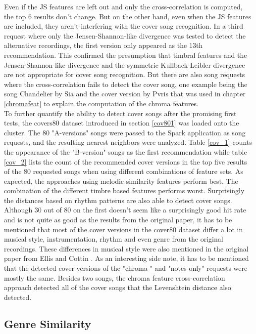 \noindent Even if the JS features are left out and only the cross-correlation is computed, the top 6 results don't change. But on the other hand, even when the JS features are included, they aren't interfering with the cover song recognition. In a third request where only the Jensen-Shannon-like divergence was tested to detect the alternative recordings, the first version only appeared as the 13th recommendation. This confirmed the presumption that timbral features and the Jensen-Shannon-like divergence and the symmetric Kullback-Leibler divergence are not appropriate for cover song recognition.
\noindent But there are also song requests where the cross-correlation fails to detect the cover song, one example being the song Chandelier by Sia and the cover version by Pvris that was used in chapter \ref{chromafeat} to explain the computation of the chroma features.\\
\noindent To further quantify the ability to detect cover songs after the promising first tests, the covers80 dataset introduced in section \ref{cov801} was loaded onto the cluster. The 80 "A-versions" songs were passed to the Spark application as song requests, and the resulting nearest neighbors were analyzed. Table \ref{cov_1} counts the appearance of the "B-version" songs as the first recommendation while table \ref{cov_2} lists the count of the recommended cover versions in the top five results of the 80 requested songs when using different combinations of feature sets. As expected, the approaches using melodic similarity features perform best. The combination of the different timbre based features performs worst. Surprisingly the distances based on rhythm patterns are also able to detect cover songs.\\
\noindent Although 30 out of 80 on the first doesn't seem like a surprisingly good hit rate and is not quite as good as the results from the original paper, it has to be mentioned that most of the cover versions in the cover80 dataset differ a lot in musical style, instrumentation, rhythm and even genre from the original recordings. These differences in musical style were also mentioned in the original paper from Ellis and Cottin \cite[p. 3]{cover802}.
\noindent As an interesting side note, it has to be mentioned that the detected cover versions of the "chroma-" and "notes-only" requests were mostly the same. Besides two songs, the chroma feature cross-correlation approach detected all of the cover songs that the Levenshtein distance also detected. 

\subsection{Genre Similarity}\label{genrerec}

